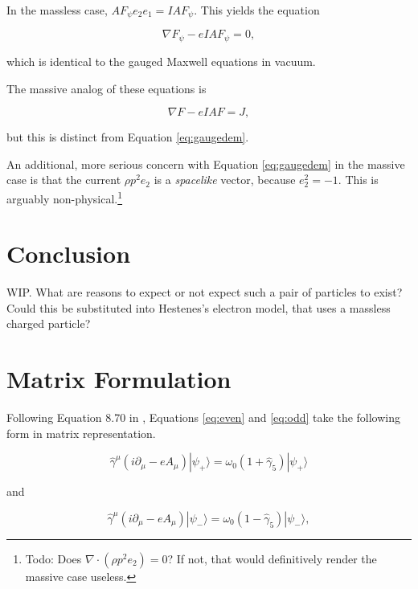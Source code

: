 \documentclass{article}
\begin{document}
    In the massless case, $A F_\psi e_2 e_1 = I A F_\psi$. This yields the equation 

    \begin{equation}
      \nabla F_\psi - e I A F_\psi = 0,
    \end{equation}

    which is identical to the gauged Maxwell equations in vacuum.\cite{duality}\cite{malik}\cite{tiwari}

    The massive analog of these equations is \cite{tiwari}

    \begin{equation}
      \nabla F - e I A F = J,
    \end{equation}

    but this is distinct from Equation \ref{eq:gaugedem}. 

    An additional, more serious concern with Equation \ref{eq:gaugedem} in the massive case is that the current $\rho p^2 e_2$ is a \emph{spacelike} vector, because $e_2^2 = -1$. This is arguably non-physical.\footnote{Todo: Does $\nabla \cdot (\rho p^2 e_2) = 0$? If not, that would definitively render the massive case useless.}

  \section{Conclusion}

  WIP. What are reasons to expect or not expect such a pair of particles to exist? Could this be substituted into Hestenes's electron model, that uses a massless charged particle?

  \newpage

  \appendix

  \section{Matrix Formulation} \label{matrix}

  Following Equation 8.70 in \cite{gap}, Equations \ref{eq:even} and \ref{eq:odd} take the following form in matrix representation.

  \begin{equation}
    \hat \gamma^\mu (i \partial_\mu - e A_\mu) | \psi_+ \rangle = \omega_0 (1 + \hat \gamma_5) | \psi_+ \rangle
  \end{equation}

  and

  \begin{equation}
    \hat \gamma^\mu (i \partial_\mu - e A_\mu) | \psi_- \rangle = \omega_0 (1 - \hat \gamma_5) | \psi_- \rangle,
  \end{equation}
\end{document}
